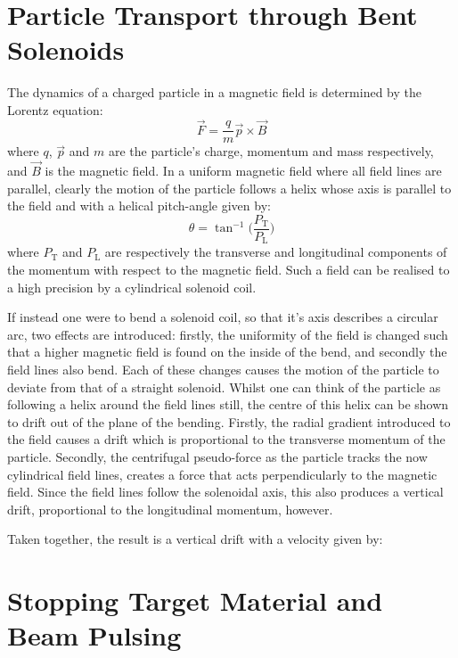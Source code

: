 \section{Particle Transport through Bent Solenoids}
The dynamics of a charged particle in a magnetic field is determined by the Lorentz equation:
\begin{equation}
\vec{F}=\frac{q}{m}\vec{p}\times\vec{B}
\end{equation}
where $q$, $\vec{p}$ and $m$ are the particle's charge, momentum and mass respectively, and $\vec{B}$ is the magnetic field.
In a uniform magnetic field where all field lines are parallel, clearly the motion of the particle follows a helix whose axis is parallel to the field and
with a helical pitch-angle given by:
\begin{equation}
\theta=\tan^{-1}\Big(\frac{P_\mathrm{T}}{P_\mathrm{L}}\Big)
\end{equation}
where $P_\mathrm{T}$ and $P_\mathrm{L}$ are respectively the transverse and longitudinal components of the momentum with respect to the magnetic field.
Such a field can be realised to a high precision by a cylindrical solenoid coil.

If instead one were to bend a solenoid coil, so that it's axis describes a circular arc, two effects are introduced:  firstly, the uniformity of the field is changed
such that a higher magnetic field is found on the inside of the bend, and secondly the field lines also bend.
Each of these changes causes the motion of the particle to deviate from that of a straight solenoid.
Whilst one can think of the particle as following a helix around the field lines still, the centre of this helix can be shown to drift out of the plane of the bending.
Firstly, the radial gradient introduced to the field causes a drift which is proportional to the transverse momentum of the particle.
Secondly, the centrifugal pseudo-force as the particle tracks the now cylindrical field lines, creates a force that acts perpendicularly to the magnetic field.
Since the field lines follow the solenoidal axis, this also produces a vertical drift, proportional to the longitudinal momentum, however.

Taken together, the result is a vertical drift with a velocity given by:
\begin{equation}
\end{equation}

\section{Stopping Target Material and Beam Pulsing}

